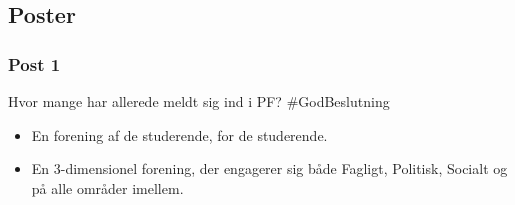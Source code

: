 
\subsection{Poster}
\subsubsection{Post 1}
Hvor mange har allerede meldt sig ind i PF? \#GodBeslutning

\begin{itemize}
 \item En forening af de studerende, for de studerende.
 \item En 3-dimensionel forening, der engagerer sig både Fagligt, Politisk, Socialt og på alle områder imellem.
\end{itemize}

